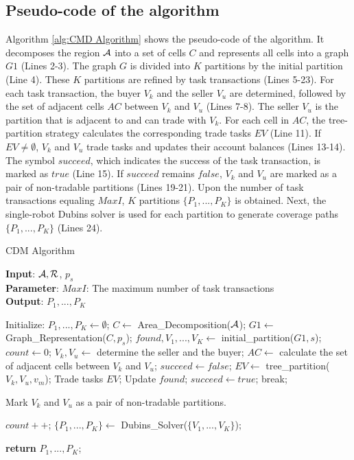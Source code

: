 \documentclass[journal,article,submit,pdftex,moreauthors]{Definitions/mdpi}
\begin{document}
\subsection{Pseudo-code of the  algorithm}

Algorithm \ref{alg:CMD Algorithm} shows the pseudo-code of the  algorithm. It decomposes the region $\cal{A}$ into a set of cells $C$ and represents all cells into a graph $G1$ (Lines 2-3). The graph $G$ is divided into $K$ partitions by the initial partition (Line 4). These $K$ partitions are refined by task transactions (Lines 5-23). For each task transaction, the buyer $V_k$ and the seller $V_u$ are determined, followed by the set of adjacent cells $AC$ between $V_k$ and $V_u$ (Lines 7-8). The seller $V_u$ is the partition that is adjacent to and can trade with $V_k$. For each cell in $AC$, the tree-partition strategy calculates the corresponding trade tasks $EV$ (Line 11). If $EV \neq \emptyset$, $V_k$ and $V_u$ trade tasks and updates their account balances (Lines 13-14). The symbol $succeed$, which indicates the success of the task transaction, is marked as $true$ (Line 15). If $succeed$ remains $false$, $V_k$ and $V_u$ are marked as a pair of non-tradable partitions (Lines 19-21). Upon the number of task transactions equaling $MaxI$, $K$ partitions $\{P_1, ...,P_K\}$ is obtained. Next, the single-robot Dubins solver \cite{c25} is used for each partition to generate coverage paths $\{P_1, ...,P_K\}$ (Lines 24).


\begin{algorithm}[hb]
\caption{CDM Algorithm}
\label{alg:CMD Algorithm}
\textbf{Input}: $ \cal{A}, R$, $p_s $\\
\textbf{Parameter}: $MaxI$: The maximum number of task transactions\\
\textbf{Output}: $P_1, ...,P_K$
\begin{algorithmic}[1] %
\STATE Initialize: $P_1, ...,P_K \gets \emptyset$;
\STATE $C \gets$ Area\_Decomposition($ \cal{A}$);
\STATE $G1 \gets$ Graph\_Representation($C, p_s$);
\STATE $found, V_1,...,V_K \gets$ initial\_partition($G1, s$);
\STATE $count \gets 0$;
    \STATE $V_k, V_u \gets$ determine the seller and the buyer;
    \STATE $AC \gets$ calculate the set of adjacent cells between $V_k$ and $V_u$;
    \STATE $succeed \gets false$;
        \STATE $EV \gets$ tree\_partition($V_k,V_u,v_m$);
            \STATE Trade tasks $EV$;
            \STATE Update $found$;
            \STATE $succeed \gets true$;
            \STATE break;
        \ENDIF
    \ENDFOR

        \STATE Mark $V_k$ and $V_u$ as a pair of non-tradable partitions.
    \ENDIF

    \STATE $count ++$;
\ENDWHILE
\STATE $\{P_1, ...,P_K\} \gets$  Dubins\_Solver($\{V_1,...,V_K\}$);

\STATE \textbf{return} $P_1, ...,P_K$;
\end{algorithmic}
\end{algorithm}
\end{document}
